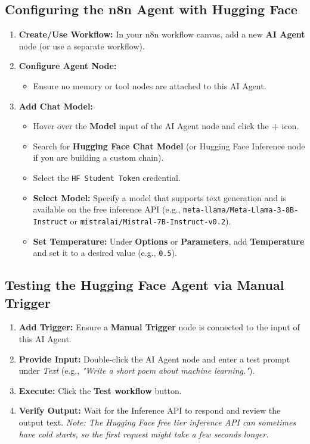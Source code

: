 \documentclass[12pt,a4paper]{article}
\begin{document}
\subsection{Configuring the n8n Agent with Hugging Face}
\begin{enumerate}[label=\textbf{Step \arabic*.}]
    \item \textbf{Create/Use Workflow:} In your n8n workflow canvas, add a new \textbf{AI Agent} node (or use a separate workflow).
    \item \textbf{Configure Agent Node:} 
    \begin{itemize}
        \item Ensure no memory or tool nodes are attached to this AI Agent.
    \end{itemize}
    \item \textbf{Add Chat Model:}
    \begin{itemize}
        \item Hover over the \textbf{Model} input of the AI Agent node and click the \textbf{+} icon.
        \item Search for \textbf{Hugging Face Chat Model} (or Hugging Face Inference node if you are building a custom chain).
        \item Select the \texttt{HF Student Token} credential.
        \item \textbf{Select Model:} Specify a model that supports text generation and is available on the free inference API (e.g., \texttt{meta-llama/Meta-Llama-3-8B-Instruct} or \texttt{mistralai/Mistral-7B-Instruct-v0.2}).
        \item \textbf{Set Temperature:} Under \textbf{Options} or \textbf{Parameters}, add \textbf{Temperature} and set it to a desired value (e.g., \texttt{0.5}).
    \end{itemize}
\end{enumerate}

\subsection{Testing the Hugging Face Agent via Manual Trigger}
\begin{enumerate}[label=\textbf{Step \arabic*.}]
    \item \textbf{Add Trigger:} Ensure a \textbf{Manual Trigger} node is connected to the input of this AI Agent.
    \item \textbf{Provide Input:} Double-click the AI Agent node and enter a test prompt under \textit{Text} (e.g., \textit{"Write a short poem about machine learning."}).
    \item \textbf{Execute:} Click the \textbf{Test workflow} button.
    \item \textbf{Verify Output:} Wait for the Inference API to respond and review the output text. \textit{Note: The Hugging Face free tier inference API can sometimes have cold starts, so the first request might take a few seconds longer.}
\end{enumerate}
\end{document}

